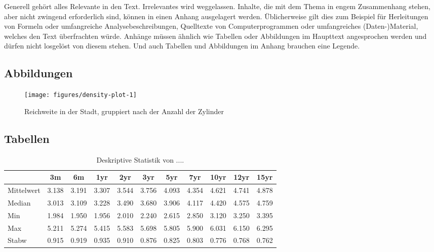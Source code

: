 \documentclass[a4paper,12pt]{article}
\begin{document}
Generell gehört alles Relevante in den Text. Irrelevantes wird weggelassen. Inhalte, die mit dem Thema in engem Zusammenhang stehen, aber nicht zwingend erforderlich sind, können in einen Anhang ausgelagert werden. Üblicherweise gilt dies zum Beispiel für Herleitungen von Formeln oder umfangreiche Analysebeschreibungen, Quelltexte von Computerprogrammen oder umfangreiches (Daten-)Material, welches den Text überfrachten würde.
Anhänge müssen ähnlich wie Tabellen oder Abbildungen im Haupttext angesprochen werden und dürfen nicht losgelöst von diesem stehen. Und auch Tabellen und Abbildungen im Anhang brauchen eine Legende.

\hypertarget{abbildungen-1}{%
\subsection{Abbildungen}\label{abbildungen-1}}
\begin{figure}

{\centering \texttt{[image: figures/density-plot-1]} 

}

\caption{Reichweite in der Stadt, gruppiert nach der Anzahl der Zylinder}\label{fig:density-plot}
\end{figure}
\hypertarget{tabellen-1}{%
\subsection{Tabellen}\label{tabellen-1}}
\begin{table}[ht]
    \caption{Deskriptive Statistik von .... }
    \label{tab:apptable}
    \begin{center}
        {\footnotesize
        \begin{tabular}{l|cccccccccc}
        \hline \hline
                        & 3m    & 6m    & 1yr   & 2yr   & 3yr   & 5yr   & 7yr   & 10yr  & 12yr  & 15yr   \\
            \hline
                Mittelwert   & 3.138 & 3.191 & 3.307 & 3.544 & 3.756 & 4.093 & 4.354 & 4.621 & 4.741 & 4.878  \\
                Median & 3.013 & 3.109 & 3.228 & 3.490 & 3.680 & 3.906 & 4.117 & 4.420 & 4.575 & 4.759  \\
                Min    & 1.984 & 1.950 & 1.956 & 2.010 & 2.240 & 2.615 & 2.850 & 3.120 & 3.250 & 3.395  \\
                Max    & 5.211 & 5.274 & 5.415 & 5.583 & 5.698 & 5.805 & 5.900 & 6.031 & 6.150 & 6.295  \\
                Stabw    & 0.915 & 0.919 & 0.935 & 0.910 & 0.876 & 0.825 & 0.803 & 0.776 & 0.768 & 0.762  \\
            \hline \hline
        \end{tabular}}
    \end{center}
\end{table}
\newpage
\end{document}
